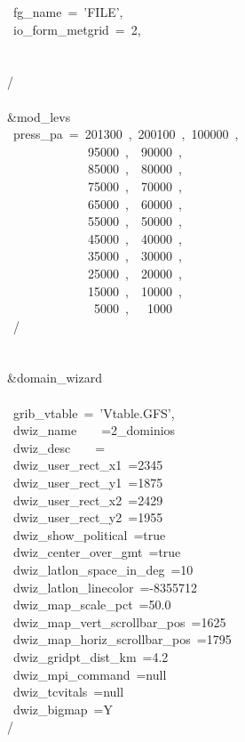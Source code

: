 ~fg\_name~=~'FILE',\\
~io\_form\_metgrid~=~2,\\
\\
\\
/\\
\\
\&mod\_levs\\
~press\_pa~=~201300~,~200100~,~100000~,\\
~~~~~~~~~~~~~95000~,~~90000~,\\
~~~~~~~~~~~~~85000~,~~80000~,\\
~~~~~~~~~~~~~75000~,~~70000~,\\
~~~~~~~~~~~~~65000~,~~60000~,\\
~~~~~~~~~~~~~55000~,~~50000~,\\
~~~~~~~~~~~~~45000~,~~40000~,\\
~~~~~~~~~~~~~35000~,~~30000~,\\
~~~~~~~~~~~~~25000~,~~20000~,\\
~~~~~~~~~~~~~15000~,~~10000~,\\
~~~~~~~~~~~~~~5000~,~~~1000\\
~/\\
\\
\\
\&domain\_wizard\\
\\
~grib\_vtable~=~'Vtable.GFS',\\
~dwiz\_name~~~~=2\_dominios\\
~dwiz\_desc~~~~=\\
~dwiz\_user\_rect\_x1~=2345\\
~dwiz\_user\_rect\_y1~=1875\\
~dwiz\_user\_rect\_x2~=2429\\
~dwiz\_user\_rect\_y2~=1955\\
~dwiz\_show\_political~=true\\
~dwiz\_center\_over\_gmt~=true\\
~dwiz\_latlon\_space\_in\_deg~=10\\
~dwiz\_latlon\_linecolor~=-8355712\\
~dwiz\_map\_scale\_pct~=50.0\\
~dwiz\_map\_vert\_scrollbar\_pos~=1625\\
~dwiz\_map\_horiz\_scrollbar\_pos~=1795\\
~dwiz\_gridpt\_dist\_km~=4.2\\
~dwiz\_mpi\_command~=null\\
~dwiz\_tcvitals~=null\\
~dwiz\_bigmap~=Y\\
/\\

